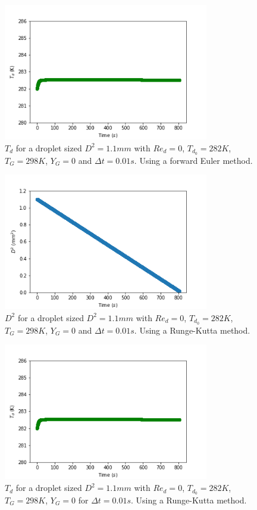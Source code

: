 \documentclass[]{article}
\begin{document}
\begin{figure}[h]
	\centering
	\includegraphics[width=0.8\textwidth]{heat_mass_euler_0_01_mass_lim_temp}
	\caption{$T_d$ for a droplet sized $D^2=1.1mm$ with $Re_d=0$, $T_{d_0}=282K$, $T_G=298K$, $Y_G=0$ and $\Delta t=0.01s$. Using a forward Euler method.}
	\label{heat_mass_euler_0_01_mass_lim_temp}
\end{figure}

\begin{figure}[h]
	\centering
	\includegraphics[width=0.8\textwidth]{heat_mass_runge_kutta_0_01_mass_lim_mass}
	\caption{$D^2$ for a droplet sized $D^2=1.1mm$ with $Re_d=0$, $T_{d_0}=282K$, $T_G=298K$, $Y_G=0$ and $\Delta t=0.01s$. Using a Runge-Kutta method.}
	\label{heat_mass_runge_kutta_0_01_mass_lim_mass}
\end{figure}

\begin{figure}[h]
	\centering
	\includegraphics[width=0.8\textwidth]{heat_mass_runge_kutta_0_01_mass_lim_temp}
	\caption{$T_d$ for a droplet sized $D^2=1.1mm$ with $Re_d=0$, $T_{d_0}=282K$, $T_G=298K$, $Y_G=0$ for $\Delta t=0.01s$. Using a Runge-Kutta method.}
	\label{heat_mass_runge_kutta_0_01_mass_lim_temp}
\end{figure}
\end{document}
